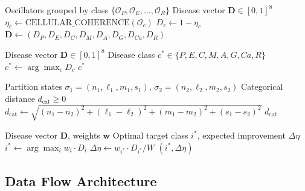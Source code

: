 \documentclass[10pt,twocolumn]{article}
\theoremstyle{plain}
\theoremstyle{definition}
\theoremstyle{remark}
\newcommand{\dcat}{d_{\mathrm{cat}}}
\newcommand{\Dvec}{\mathbf{D}}
\begin{document}
\begin{algorithm}[h]
\caption{DISEASE\_VECTOR: Compute disease state vector}
\label{alg:disease}
\begin{algorithmic}[1]
\REQUIRE Oscillators grouped by class $\{\mathcal{O}_{P}, \mathcal{O}_{E}, \ldots, \mathcal{O}_{R}\}$
\ENSURE Disease vector $\Dvec \in [0,1]^8$
    \STATE $\eta_c \leftarrow \text{CELLULAR\_COHERENCE}(\mathcal{O}_c)$
    \STATE $D_c \leftarrow 1 - \eta_c$
\ENDFOR
\RETURN $\Dvec \leftarrow (D_P, D_E, D_C, D_M, D_A, D_G, D_{Ca}, D_R)$
\end{algorithmic}
\end{algorithm}

\begin{algorithm}[h]
\caption{CLASSIFY: Geometric disease classification}
\label{alg:classify}
\begin{algorithmic}[1]
\REQUIRE Disease vector $\Dvec \in [0,1]^8$
\ENSURE Disease class $c^* \in \{P, E, C, M, A, G, Ca, R\}$
\STATE $c^* \leftarrow \arg\max_{c} D_c$
\RETURN $c^*$
\end{algorithmic}
\end{algorithm}

\begin{algorithm}[h]
\caption{CATEGORICAL\_DISTANCE: Compute partition distance}
\label{alg:distance}
\begin{algorithmic}[1]
\REQUIRE Partition states $\sigma_1 = (n_1, \ell_1, m_1, s_1)$, $\sigma_2 = (n_2, \ell_2, m_2, s_2)$
\ENSURE Categorical distance $\dcat \geq 0$
\STATE $\dcat \leftarrow \sqrt{(n_1 - n_2)^2 + (\ell_1 - \ell_2)^2 + (m_1 - m_2)^2 + (s_1 - s_2)^2}$
\RETURN $\dcat$
\end{algorithmic}
\end{algorithm}

\begin{algorithm}[h]
\caption{INTERVENTION: Compute optimal therapeutic target}
\label{alg:intervention}
\begin{algorithmic}[1]
\REQUIRE Disease vector $\Dvec$, weights $\mathbf{w}$
\ENSURE Optimal target class $i^*$, expected improvement $\Delta\eta$
\STATE $i^* \leftarrow \arg\max_{i} w_i \cdot D_i$
\STATE $\Delta\eta \leftarrow w_{i^*} \cdot D_{i^*} / W$
\RETURN $(i^*, \Delta\eta)$
\end{algorithmic}
\end{algorithm}

\subsection{Data Flow Architecture}
\end{document}
